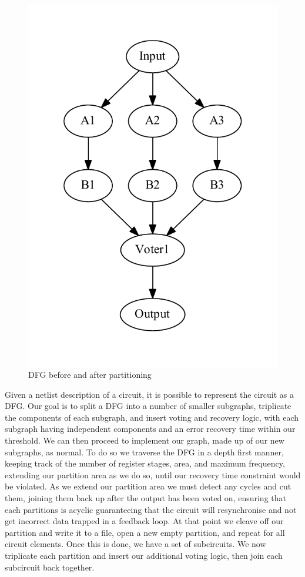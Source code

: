 \documentclass[12pt,final,oneside]{dwThesis} %
\begin{document}
\begin{figure}
\begin{center}
         \includegraphics[height=0.2\textheight]{images/TMR-post.pdf}
         \caption{\ac{DFG} before and after partitioning}
         \label{TMRFigure}
      \end{center}
   \end{figure}
   Given a netlist description of a circuit, it is possible to represent the circuit as a \ac{DFG}\cite{FPGAArch}. Our goal is to split a \ac{DFG} into a number of smaller subgraphs, triplicate the components of each subgraph, and insert voting and recovery logic, with each subgraph having independent components and an error recovery time within our threshold. We can then proceed to implement our graph, made up of our new subgraphs, as normal.
   To do so we traverse the \ac{DFG} in a depth first manner, keeping track of the number of register stages, area, and maximum frequency, extending our partition area as we do so, until our recovery time constraint would be violated.
   As we extend our partition area we must detect any cycles and cut them, joining them back up after the output has been voted on, ensuring that each partitions is acyclic guaranteeing that the circuit will resynchronise and not get incorrect data trapped in a feedback loop.
   At that point we cleave off our partition and write it to a file, open a new empty partition, and repeat for all circuit elements.
   Once this is done, we have a set of subcircuits. We now triplicate each partition and insert our additional voting logic, then join each subcircuit back together.
\end{document}
